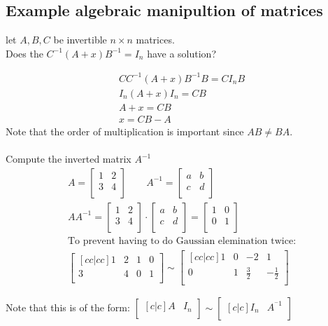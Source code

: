 \documentclass[11pt, a4paper]{article}
\begin{document}
\subsection{Example algebraic manipultion of matrices}
let $A,B,C$ be invertible $n\times n$ matrices.\\
Does the $C^{-1}(A+x)B^{-1}=I_n$ have a solution?

\begin{gather*}
  CC^{-1}(A+x)B^{-1}B=CI_nB\\
  I_n(A+x)I_n=CB\\
  A+x = CB\\
  x = CB-A
\end{gather*}
Note that the order of multiplication is important since $AB \neq BA$.\\
\\
Compute the inverted matrix $A^{-1}$
\begin{gather*}
  A =
  \begin{bmatrix}
    1 & 2\\
    3 & 4\\
  \end{bmatrix}
  \qquad A^{-1} =
  \begin{bmatrix}
    a & b\\
    c & d\\
  \end{bmatrix}\\
  AA^{-1} =
  \begin{bmatrix}
    1 & 2\\
    3 & 4\\
  \end{bmatrix}
  \cdot
  \begin{bmatrix}
    a & b\\
    c& d\\
  \end{bmatrix}
  =
  \begin{bmatrix}
     1 & 0\\
     0 & 1\\
  \end{bmatrix}\\
  \text{To prevent having to do Gaussian elemination twice:}\\
  \begin{bmatrix}[cc|cc]
    1 & 2 & 1 & 0\\
    3 & 4 & 0 & 1\\
  \end{bmatrix}
  \sim
  \begin{bmatrix}[cc|cc]
    1 & 0 & -2 & 1\\
    0 & 1 & \frac{3}{2} & -\frac{1}{2}\\
  \end{bmatrix}
\end{gather*}

Note that this is of the form: $\begin{bmatrix}[c|c]A & I_n\\ \end{bmatrix} \sim \begin{bmatrix}[c|c]I_n & A^{^-1}\\ \end{bmatrix}$
\end{document}
